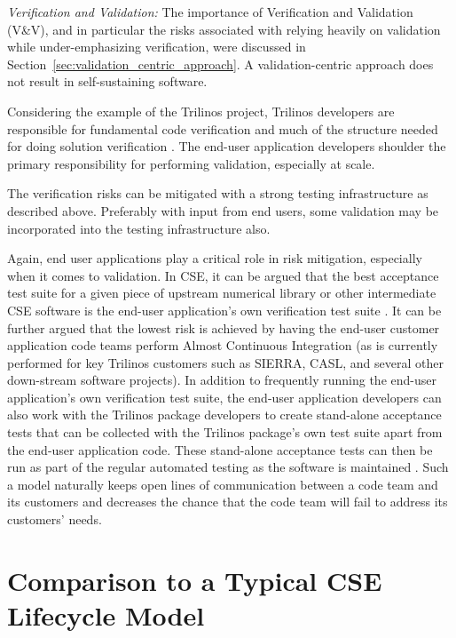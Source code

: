 \documentclass[11pt]{SANDreport}
\begin{document}
{}\textit{Verification and Validation:} The importance of Verification
and Validation (V\&V), and in particular the risks associated with
relying heavily on validation while under-emphasizing verification,
were discussed in Section~\ref{sec:validation_centric_approach}.  A
validation-centric approach does not result in self-sustaining
software.

Considering the example of the Trilinos project, Trilinos developers are
responsible for fundamental code verification and much of the
structure needed for doing solution verification
{}\cite{SEVVIntersections05}.  The end-user application
developers shoulder the primary responsibility for performing validation,
especially at scale.

The verification risks can be mitigated with a strong testing
infrastructure as described above.  Preferably with input from end
users, some validation may be incorporated into the testing
infrastructure also.

Again, end user applications play a critical role in risk mitigation,
especially when it comes to validation.  In CSE, it can be argued that
the best acceptance test suite for a given piece of upstream numerical
library or other intermediate CSE software is the end-user
application's own verification test suite
{}\cite{SoftwareIntegrationforCSE09}.  It can be further argued that
the lowest risk is achieved by having the end-user customer
application code teams perform Almost Continuous Integration
{}\cite{SoftwareIntegrationforCSE09} (as is currently performed for
key Trilinos customers such as SIERRA, CASL, and several other
down-stream software projects).  In addition to frequently running the
end-user application's own verification test suite, the end-user
application developers can also work with the Trilinos package
developers to create stand-alone acceptance tests that can be
collected with the Trilinos package's own test suite apart from the
end-user application code.  These stand-alone acceptance tests can
then be run as part of the regular automated testing as the software
is maintained {}\cite{DomainDrivenDesign}.  Such a model naturally
keeps open lines of communication between a code team and its
customers and decreases the chance that the code team will fail to
address its customers' needs.

%
\section{Comparison to a Typical CSE Lifecycle Model}
\label{sec:compare_with_typical_CSE_model}
%
\end{document}
